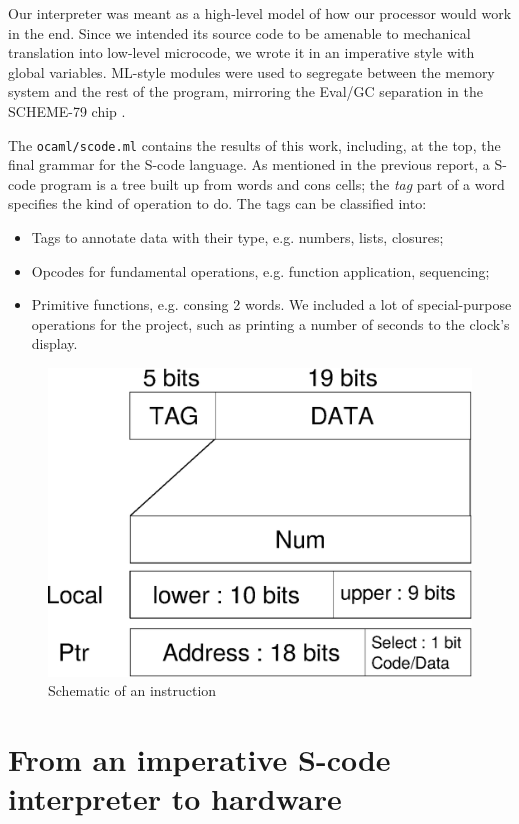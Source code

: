 \documentclass[a4paper, 11pt]{article}
\begin{document}
Our interpreter was meant as a high-level model of how our processor would work in the end. Since  we intended its source code to be amenable to mechanical translation into low-level microcode, we wrote it in an imperative style with global variables. ML-style modules were used to segregate between the memory system and the rest of the program, mirroring the Eval/GC separation in the SCHEME-79 chip \cite{SCHEME-79}.

The \texttt{ocaml/scode.ml} contains the results of this work, including, at the top, the final grammar for the S-code language. As mentioned in the previous report, a S-code program is a tree built up from words and cons cells; the \emph{tag} part of a word specifies the kind of operation to do. The tags can be classified into:
\begin{itemize}
\item Tags to annotate data with their type, e.g. numbers, lists, closures;
\item Opcodes for fundamental operations, e.g. function application, sequencing;
\item Primitive functions, e.g. consing 2 words. We included a lot of special-purpose operations for the project, such as printing a number of seconds to the clock's display.
\end{itemize}


\begin{figure}[h]
\center
\caption{Schematic of an instruction}
   \includegraphics[scale=0.5]{words.eps}
\end{figure}


\section{From an imperative S-code interpreter to hardware}
\end{document}
